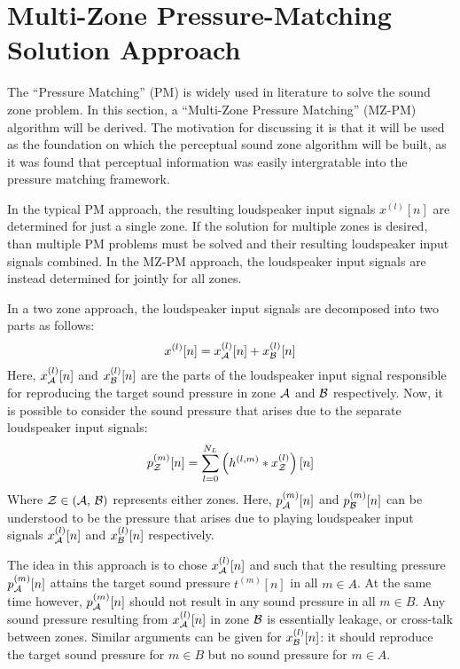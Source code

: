 \section{Multi-Zone Pressure-Matching Solution Approach}
\label{sec:sound_zones:pressure_matching}
The ``Pressure Matching'' (PM) is widely used in literature to solve the sound zone problem.
In this section, a ``Multi-Zone Pressure Matching'' (MZ-PM) algorithm will be derived.
The motivation for discussing it is that it will be used as the foundation on which the perceptual sound zone algorithm will be built, 
as it was found that perceptual information was easily intergratable into the pressure matching framework.

In the typical PM approach, the resulting loudspeaker input signals $x^{(l)}[n]$ are determined for just a single zone.
If the solution for multiple zones is desired, than multiple PM problems must be solved and their resulting loudspeaker input signals combined. 
In the MZ-PM approach, the loudspeaker input signals are instead determined for jointly for all zones.

In a two zone approach, the loudspeaker input signals are decomposed into two parts as follows:
\begin{equation}
    x^{(l)}[n] = x_{\mathcal{A}}^{(l)}[n] + x_{\mathcal{B}}^{(l)}[n]
\end{equation}
Here, $x_{\mathcal{A}}^{(l)}[n]$ and $x_{\mathcal{B}}^{(l)}[n]$ are the parts of the loudspeaker input signal responsible for reproducing the target sound pressure 
in zone $\mathcal{A}$ and $\mathcal{B}$ respectively.
Now, it is possible to consider the sound pressure that arises due to the separate loudspeaker input signals:
\begin{align}
    p_{\mathcal{Z}}^{(m)}[n] &= \sum_{l=0}^{N_L} \left(h^{(l,m)} \ast x_{\mathcal{Z}}^{(l)}\right)[n] \\
\end{align}
Where $\mathcal{Z} \in \left(\mathcal{A},\,\mathcal{B}\right)$ represents either zones.
Here, $p_{\mathcal{A}}^{(m)}[n]$ and $p_{\mathcal{B}}^{(m)}[n]$ can be understood to be the pressure that arises due to 
playing loudspeaker input signals $x_{\mathcal{A}}^{(l)}[n]$ and $x_{\mathcal{B}}^{(l)}[n]$ respectively. 

The idea in this approach is to chose $x_{\mathcal{A}}^{(l)}[n]$ and such that the resulting pressure $p_{\mathcal{A}}^{(m)}[n]$ attains the target sound pressure $t^{(m)}[n]$ in all $m \in A$.   
At the same time however, $p_{\mathcal{A}}^{(m)}[n]$ should not result in any sound pressure in all $m \in B$.
Any sound pressure resulting from $x_{\mathcal{A}}^{(l)}[n]$ in zone $\mathcal{B}$ is essentially leakage, or cross-talk between zones. 
Similar arguments can be given for $x_{\mathcal{B}}^{(l)}[n]$: it should reproduce the target sound pressure for $m \in B$ but no sound pressure for $m \in A$. 

